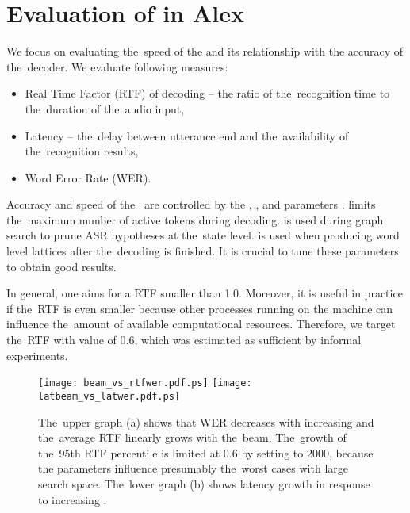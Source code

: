 \section{Evaluation of  in Alex}
\label{sec:eval}
We focus on evaluating the~speed of the  and its relationship with the accuracy of the~decoder.
We evaluate following measures:
\begin{itemize}
    \item Real Time Factor (RTF) of decoding -- the ratio of the~recognition time to the~duration of the~audio input,
    \item Latency -- the~delay between utterance end and the~availability of the~recognition results,
    \item Word Error Rate (WER).
\end{itemize}

Accuracy and speed of the~ are controlled by the ,   , and  parameters \cite{povey2011kaldi}.
 limits the~maximum number of active tokens during decoding.
 is used during graph search to prune ASR hypotheses at the~state level.
 is used when producing word level lattices after the~decoding is finished.
It is crucial to tune these parameters to obtain good results.

In general, one aims for a \ac{RTF} smaller than 1.0.
Moreover, it is useful in practice if the~RTF is even smaller because other processes running on the machine can influence the~amount of available computational resources.
Therefore, we target the~RTF with value of 0.6, which was estimated as sufficient by informal experiments.

\begin{figure*}[t]
    \begin{center}
    \texttt{[image: beam\_vs\_rtfwer.pdf.ps]}
    \texttt{[image: latbeam\_vs\_latwer.pdf.ps]}
    \caption{The~upper graph (a) shows that WER decreases with increasing  and the~average RTF linearly grows with the~beam.
        The~growth of the~95th RTF percentile is limited at 0.6 by setting  to 2000, because the  parameters influence presumably the~worst cases with large search space.
    The~lower graph (b) shows latency growth in response to increasing .}
    \label{fig:wer} 
    \end{center}
\end{figure*}


